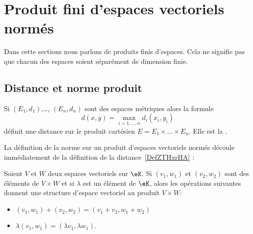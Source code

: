 
\section{Produit fini d'espaces vectoriels normés}
\label{sec_prod}

Dans cette sections nous parlons de produits finis d'espaces. Cela ne signifie pas que chacun des espaces soient séparément de dimension finie.

\subsection{Distance et norme produit}

\begin{propositionDef}    \label{DefZTHxrHA}
	Si \( (E_1,d_1)\),\ldots, \( (E_n,d_n)\) sont des espaces métriques alors la formule
	\begin{equation}
		d(x,y)=\max_{i=1,\ldots, n}d_i(x_i,y_i)
	\end{equation}
	définit une distance sur le produit cartésien \( E=E_1\times\ldots\times E_n\). Elle est la .
\end{propositionDef}

La définition de la norme sur un produit d'espaces vectoriels normés découle immédiatement de la définition de la distance~\ref{DefZTHxrHA} :
\begin{lemmaDef}  \label{DefFAJgTCE}
	Soient \( V\) et \( W\) deux espaces vectoriels sur \( \eK\). Si \( (v_1,w_1)\) et \( (v_2,w_2)\) sont des éléments de \( V\times W\) et si \( \lambda\) est un élément de \( \eK\), alors les opérations suivantes donnent une structure d'espace vectoriel au produit \( V\times W\):
	\begin{itemize}
		\item \( (v_1,w_1)+(v_2,w_2)=(v_1+v_2,w_1+w_2)\)
		\item \( \lambda(v_1,w_1)=(\lambda v_1,\lambda w_1)\).
	\end{itemize}
\end{lemmaDef}

